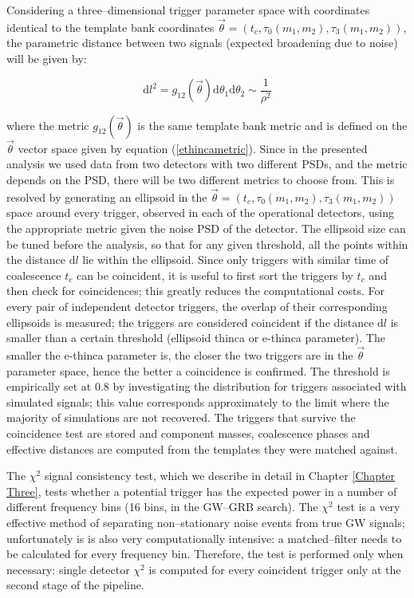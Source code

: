Considering a three--dimensional trigger parameter space with coordinates identical to the template bank coordinates $\vec{\theta} = (t_c, \tau_0(m_1,m_2), \tau_3(m_1,m_2))$, the parametric distance between two signals (expected broadening due to noise) will be given by:

\begin{equation}
\mathrm{d}l^2 = g_{12}(\vec{\theta})\mathrm{d} \theta_1\mathrm{d}\theta_2 \sim \frac{1}{\rho^2}
\end{equation}

\noindent where the metric $g_{12}(\vec{\theta})$ is the same template bank metric and is defined on the $\vec{\theta}$ vector space given by equation (\ref{ethincametric}). Since in the presented analysis we used data from two detectors with two different PSDs, and the metric depends on the PSD, there will be two different metrics to choose from. This is resolved by generating an ellipsoid in the $\vec{\theta} = (t_c, \tau_0(m_1,m_2), \tau_3(m_1,m_2))$ space around every trigger, observed in each of the operational detectors, using the appropriate metric given the noise PSD of the detector. The ellipsoid size can be tuned before the analysis, so that for any given threshold, all the points within the distance $\mathrm{d}l$ lie within the ellipsoid. Since only triggers with similar time of coalescence $t_c$ can be coincident, it is useful to first sort the triggers by $t_c$ and then check for coincidences; this greatly reduces the computational costs. For every pair of independent detector triggers, the overlap of their corresponding ellipsoids is measured; the triggers are considered coincident if the distance $\mathrm{d}l$ is smaller than a certain threshold (ellipsoid thinca or e-thinca parameter). The smaller the e-thinca parameter is, the closer the two triggers are in the $\vec{\theta}$ parameter space, hence the better a coincidence is confirmed. The threshold is empirically set at 0.8 by investigating the distribution for triggers associated with simulated signals; this value corresponds approximately to the limit where the majority of simulations are not recovered. The triggers that survive the coincidence test are stored and component masses, coalescence phases and effective distances are computed from the templates they were matched against.

The $\chi^2$ signal consistency test, which we describe in detail in Chapter \ref{Chapter Three}, tests whether a potential trigger has the expected power in a number of different frequency bins (16 bins, in the GW--GRB search). The $\chi^2$ test is a very effective method of separating non--stationary noise events from true GW signals; unfortunately is is also very computationally intensive: a matched--filter needs to be calculated for every frequency bin. Therefore, the test is performed only when necessary: single detector $\chi^2$ is computed for every coincident trigger only at the second stage of the pipeline. 


